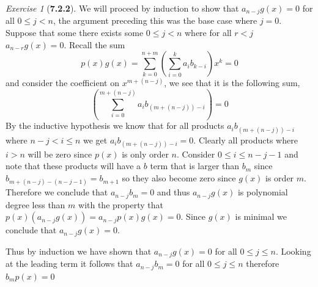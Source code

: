 \documentclass[12pt]{amsart}
\makeatletter
\theoremstyle{remark}
\newtheorem*{exercise}{Exercise}%
\renewenvironment{proof}[1][\proofname]{\par\doublespacing
  \pushQED{\qed}%
  \normalfont \topsep6\p@\@plus6\p@\relax
  \list{}{%
    \settowidth{\leftmargin}{\itshape\proofname:\hskip\labelsep}%
    \setlength{\labelwidth}{0pt}%
    \setlength{\itemindent}{-\leftmargin}%
  }%
  \item[\hskip\labelsep\itshape#1\@addpunct{:}]\ignorespaces
}{%
  \popQED\endlist\@endpefalse
  \singlespacing
}
\theoremstyle{mycomment}
\makeatother
\begin{document}
\begin{exercise}[\textbf{7.2.2}]
\begin{proof}
      We will proceed by induction to show that $a_{n - j}g(x) = 0$ for all $0 \leq j < n$, the argument preceding this was the base case where $j = 0$. 
      Suppose that  some there exists some $0 \leq j < n$ where for all $r < j$ $a_{n - r}g(x) = 0$. 
      Recall the sum
      \begin{equation*}
        p(x)g(x) = \sum_{k = 0}^{n + m} \left(\sum_{i = 0}^k a_ib_{k - i}\right) x^k = 0
        \end{equation*}
        and consider the coefficient on $x^{m + (n - j)}$, we see that it is the following sum, 
        \begin{equation*}
          \left(\sum_{i = 0}^{m + (n - j)} a_ib_{(m + (n - j)) - i}\right)= 0
        \end{equation*}  
        By the inductive hypothesis we know that for all products $a_ib_{(m + (n - j)) - i}$ where $n - j < i \leq n$ we get $a_ib_{(m + (n - j)) - i} = 0$. Clearly all products where $i > n$ will be zero since $p(x)$ is only order $n$. Consider $0 \leq i \leq n - j - 1$ and note that these products will have a $b$ term that is larger than $b_m$ since $b_{m + (n - j) - (n - j - 1)} = b_{m + 1}$ so they also become zero since $g(x)$ is order $m$. Therefore we conclude that $a_{n - j}b_m = 0$ and thus $a_{n - j}g(x)$ is polynomial degree less than $m$
        with the property that $p(x)(a_{n - j}g(x)) = a_{n - j}p(x)g(x) = 0$. Since $g(x)$ is minimal we conclude that $a_{n - j}g(x)=0$. 

        Thus by induction we have shown that $a_{n - j}g(x) = 0$ for all $0 \leq j \leq n$. Looking at the leading term it follows that $a_{n - j}b_m = 0$ for all $0 \leq j \leq n$ therefore $b_mp(x) = 0$
    \end{proof}
\end{exercise}
\vspace{.15in}
\end{document}
